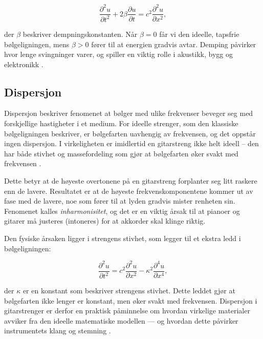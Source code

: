 \begin{equation*}
\frac{\partial^2 u}{\partial t^2} + 2\beta \frac{\partial u}{\partial t} = c^2 \frac{\partial^2 u}{\partial x^2},
\end{equation*}

der $\beta$ beskriver dempningskonstanten.  
Når $\beta = 0$ får vi den ideelle, tapsfrie bølgeligningen, mens $\beta > 0$ fører til at energien gradvis avtar.  
Demping påvirker hvor lenge svingninger varer, og spiller en viktig rolle i akustikk, bygg og elektronikk \parencite{libretextsDamping}.

\subsection{Dispersjon}

Dispersjon beskriver fenomenet at bølger med ulike frekvenser beveger seg med forskjellige hastigheter i et medium.  
For ideelle strenger, som den klassiske bølgeligningen beskriver, er bølgefarten uavhengig av frekvensen, og det oppstår ingen dispersjon.  
I virkeligheten er imidlertid en gitarstreng ikke helt ideell – den har både stivhet og massefordeling som gjør at bølgefarten øker svakt med frekvensen \parencite{kartofelev2019dispersive}.  

Dette betyr at de høyeste overtonene på en gitarstreng forplanter seg litt raskere enn de lavere.  
Resultatet er at de høyeste frekvenskomponentene kommer ut av fase med de lavere, noe som fører til at lyden gradvis mister renheten sin.  
Fenomenet kalles \textit{inharmonisitet}, og det er en viktig årsak til at pianoer og gitarer må justeres (intoneres) for at akkorder skal klinge riktig.  

Den fysiske årsaken ligger i strengens stivhet, som legger til et ekstra ledd i bølgeligningen:  

\begin{equation*}
\frac{\partial^2 u}{\partial t^2} = c^2 \frac{\partial^2 u}{\partial x^2} - \kappa^2 \frac{\partial^4 u}{\partial x^4},
\end{equation*}

der $\kappa$ er en konstant som beskriver strengens stivhet.  
Dette leddet gjør at bølgefarten ikke lenger er konstant, men øker svakt med frekvensen.  
Dispersjon i gitarstrenger er derfor en praktisk påminnelse om hvordan virkelige materialer avviker fra den ideelle matematiske modellen — og hvordan dette påvirker instrumentets klang og stemning \parencite{kartofelev2019dispersive, unswStringsHarmonics, wikipediaInharmonicity}.

